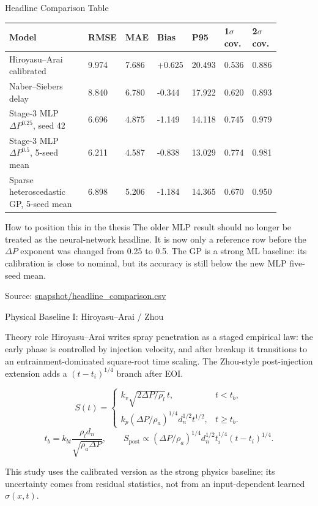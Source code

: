 \documentclass[aspectratio=169,11pt]{beamer}
\newcommand{\good}[1]{\textcolor{goodGreen}{#1}}
\newcommand{\sourcenote}[1]{\vfill{\tiny\textcolor{gray!70!black}{Source: \url{#1}}}}
\begin{document}
\begin{frame}{Headline Comparison Table}
\scriptsize
{\setlength{\tabcolsep}{3pt}
\begin{tabular}{L{0.34\linewidth}R{0.09\linewidth}R{0.09\linewidth}R{0.09\linewidth}R{0.09\linewidth}R{0.09\linewidth}R{0.09\linewidth}}
\toprule
Model & RMSE & MAE & Bias & P95 & 1\(\sigma\) cov. & 2\(\sigma\) cov. \\
\midrule
Hiroyasu--Arai calibrated & 9.974 & 7.686 & +0.625 & 20.493 & 0.536 & 0.886 \\
Naber--Siebers delay & 8.840 & 6.780 & -0.344 & 17.922 & 0.620 & 0.893 \\
Stage-3 MLP \(\Delta P^{0.25}\), seed 42 & 6.696 & 4.875 & -1.149 & 14.118 & 0.745 & 0.979 \\
\good{Stage-3 MLP \(\Delta P^{0.5}\), 5-seed mean} & \good{6.211} & \good{4.587} & \good{-0.838} & \good{13.029} & \good{0.774} & \good{0.981} \\
Sparse heteroscedastic GP, 5-seed mean & 6.898 & 5.206 & -1.184 & 14.365 & 0.670 & 0.950 \\
\bottomrule
\end{tabular}
}

\vspace{0.7em}
\small
\begin{block}{How to position this in the thesis}
The older MLP result should no longer be treated as the neural-network headline. It is now only a reference row
before the \(\Delta P\) exponent was changed from 0.25 to 0.5. The GP is a strong ML baseline: its calibration is
close to nominal, but its accuracy is still below the new MLP five-seed mean.
\end{block}

\sourcenote{snapshot/headline_comparison.csv}
\end{frame}

\begin{frame}{Physical Baseline I: Hiroyasu--Arai / Zhou}
\small
\begin{block}{Theory role}
\footnotesize
Hiroyasu--Arai writes spray penetration as a staged empirical law: the early phase is controlled by injection
velocity, and after breakup it transitions to an entrainment-dominated square-root time scaling. The Zhou-style
post-injection extension adds a \((t-t_i)^{1/4}\) branch after EOI.
\end{block}

\vspace{-0.2em}
\[
S(t)=
\begin{cases}
k_v\sqrt{2\Delta P/\rho_l}\,t, & t<t_b,\\[0.25em]
k_p(\Delta P/\rho_a)^{1/4}d_n^{1/2}t^{1/2}, & t\ge t_b.
\end{cases}
\]
\[
t_b=k_{bt}\frac{\rho_l d_n}{\sqrt{\rho_a\Delta P}},
\qquad
S_{\mathrm{post}}\propto
(\Delta P/\rho_a)^{1/4}d_n^{1/2}t_i^{1/4}(t-t_i)^{1/4}.
\]

\footnotesize
This study uses the calibrated version as the strong physics baseline; its uncertainty comes from residual statistics,
not from an input-dependent learned \(\sigma(x,t)\).
\end{frame}
\end{document}
